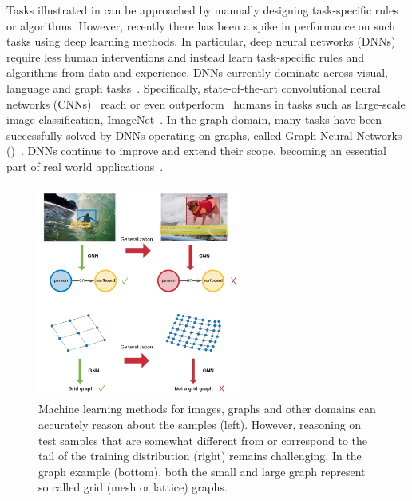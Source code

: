 Tasks illustrated in \fig{\ref{fig:intro_apps}} can be approached by manually designing task-specific rules or algorithms. However, recently there has been a spike in performance on such tasks using deep learning methods. In particular, deep neural networks (DNNs) require less human interventions and instead learn task-specific rules and algorithms from data and experience. DNNs currently dominate across visual, language and graph tasks~\citep{lecun2015deep}. Specifically, state-of-the-art convolutional neural networks (CNNs)~\citep{krizhevsky2012imagenet,he2016deep} reach or even outperform~\citep{he2015delving,cai2019onceforall} humans in tasks such as large-scale image classification, \eg ImageNet~\citep{russakovsky2015imagenet}. In the graph domain, many tasks have been successfully solved by DNNs operating on graphs, called Graph Neural Networks (\gnns)~\citep{gori2005new, scarselli2008graph, bronstein2017geometric,zhou2020graph}. 
DNNs continue to improve and extend their scope, becoming an essential part of real world applications~\citep{brown2020language}.

\begin{figure}[tbhp]
    \centering
    \includegraphics[width=0.6\textwidth, align=c]{Ch1_Intro/intro_generalization.pdf}
    \vspace{-10pt}
    \caption{\small Machine learning methods for images, graphs and other domains can accurately reason about the \IID samples (left). However, reasoning on test samples that are somewhat different from or correspond to the tail of the training distribution (right) remains challenging. In the graph example (bottom), both the small and large graph represent so called grid (mesh or lattice) graphs. }
    \label{fig:intro_generalization}
\end{figure}

